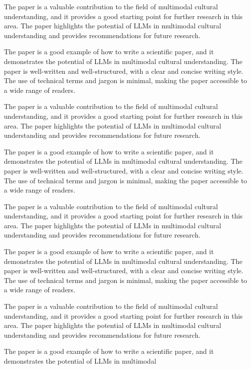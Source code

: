         The paper is a valuable contribution to the field of multimodal cultural understanding, and it provides a good starting point for further research in this area. The paper highlights the potential of LLMs in multimodal cultural understanding and provides recommendations for future research. 

        The paper is a good example of how to write a scientific paper, and it demonstrates the potential of LLMs in multimodal cultural understanding. The paper is well-written and well-structured, with a clear and concise writing style. The use of technical terms and jargon is minimal, making the paper accessible to a wide range of readers. 

        The paper is a valuable contribution to the field of multimodal cultural understanding, and it provides a good starting point for further research in this area. The paper highlights the potential of LLMs in multimodal cultural understanding and provides recommendations for future research. 

        The paper is a good example of how to write a scientific paper, and it demonstrates the potential of LLMs in multimodal cultural understanding. The paper is well-written and well-structured, with a clear and concise writing style. The use of technical terms and jargon is minimal, making the paper accessible to a wide range of readers. 

        The paper is a valuable contribution to the field of multimodal cultural understanding, and it provides a good starting point for further research in this area. The paper highlights the potential of LLMs in multimodal cultural understanding and provides recommendations for future research. 

        The paper is a good example of how to write a scientific paper, and it demonstrates the potential of LLMs in multimodal cultural understanding. The paper is well-written and well-structured, with a clear and concise writing style. The use of technical terms and jargon is minimal, making the paper accessible to a wide range of readers. 

        The paper is a valuable contribution to the field of multimodal cultural understanding, and it provides a good starting point for further research in this area. The paper highlights the potential of LLMs in multimodal cultural understanding and provides recommendations for future research. 

        The paper is a good example of how to write a scientific paper, and it demonstrates the potential of LLMs in multimodal